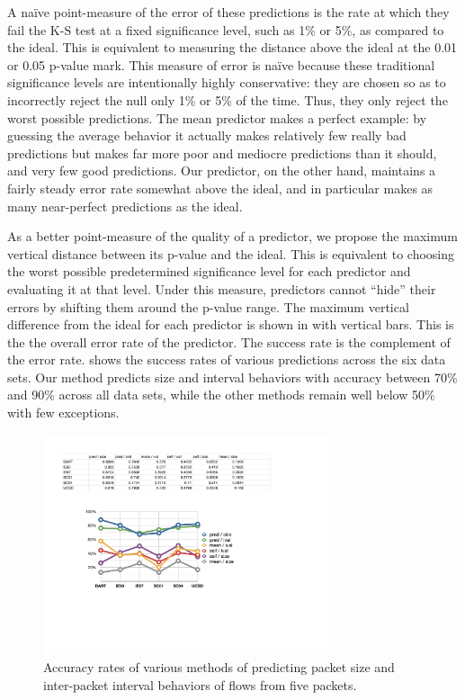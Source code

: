 \documentclass{acm_proc_article-sp}
\begin{document}
A na\"ive point-measure of the error of these predictions is the rate at which they fail the K-S test at a fixed significance level, such as 1\% or 5\%, as compared to the ideal.
This is equivalent to measuring the distance above the ideal  at the 0.01 or 0.05 p-value mark.
This measure of error is na\"ive because these traditional significance levels are intentionally highly conservative:
they are chosen so as to incorrectly reject the null only 1\% or 5\% of the time.
Thus, they only reject the worst possible predictions.
The mean predictor makes a perfect example:
by guessing the average behavior it actually makes relatively few really bad predictions but makes far more poor and mediocre predictions than it should, and very few good predictions.
Our predictor, on the other hand, maintains a fairly steady error rate somewhat above the ideal, and in particular makes as many near-perfect predictions as the ideal.

As a better point-measure of the quality of a predictor, we propose the maximum vertical distance between its p-value  and the ideal.
This is equivalent to choosing the worst possible predetermined significance level for each predictor and evaluating it at that level.
Under this measure, predictors cannot ``hide'' their errors by shifting them around the p-value range.
The maximum vertical difference from the ideal for each predictor is shown in  with vertical bars.
This is the the overall error rate of the predictor.
The success rate is the complement of the error rate.
 shows the success rates of various predictions across the six data sets.
Our method predicts size and interval behaviors with accuracy between 70\% and 90\% across all data sets, while the other methods remain well below 50\% with few exceptions.

\begin{figure}[b]
\vspace{-1em}
\begin{center}
\includegraphics[width=3.3in]{pred_stats}
\caption{Accuracy rates of various methods of predicting packet size and inter-packet interval behaviors of flows from five packets.}
\end{center}
\vspace{-1em}
\end{figure}
\end{document}
